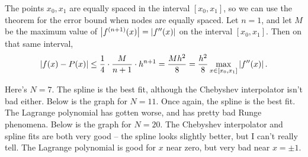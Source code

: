 \documentclass{article}
\begin{document}
\bigskip
\begin{prob}
\end{prob}
The points $x_0,x_1$ are equally spaced in the interval $[x_0, x_1]$, so we can use the theorem for the error bound when nodes are equally spaced. Let $n=1$, and let $M$ be the maximum value of $\left\lvert f^{(n+1)}(x) \right\rvert = \left\lvert f''(x) \right\rvert$ on the interval $[x_0, x_1]$. Then on that same interval,
\[ \left\lvert f(x)-P(x) \right\rvert \leq \frac{1}{4} \cdot \frac{M}{n+1} \cdot h^{n+1} = \frac{Mh^2}{8} = \frac{h^2}{8} \max_{x\in[x_0,x_1]} \left\lvert f''(x) \right\rvert. \]

\bigskip
\begin{prob}
\end{prob}
Here's $N=7$. The spline is the best fit, although the Chebyshev interpolator isn't bad either.
Below is the graph for $N=11$. Once again, the spline is the best fit. The Lagrange polynomial has gotten worse, and has pretty bad Runge phenomena.
Below is the graph for $N=20$. The Chebyshev interpolator and spline fits are both very good -- the spline looks slightly better, but I can't really tell. The Lagrange polynomial is good for $x$ near zero, but very bad near $x=\pm1$.
\end{document}
